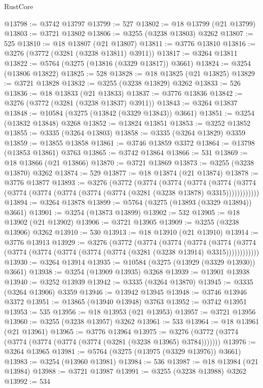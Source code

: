 \begin{lexlean}{RustCore}
\begin{coremodule}
@13798 := @3742 @13797
@13799 := 527
@13802 := @18 @13799 (@21 @13799)
@13803 := @3721 @13802
@13806 := @3255 (@3238 @13803) @3262
@13807 := 525
@13810 := @18 @13807 (@21 @13807)
@13811 := @3776 @13810
@13816 := @3276 (@3772 (@3281 (@3238 @13811) @3911))
@13817 := @3264 @13811
@13822 := @5764 (@3275 (@13816 (@3329 @13817)) @3661)
@13824 := @3254 (@13806 @13822)
@13825 := 528
@13828 := @18 @13825 (@21 @13825)
@13829 := @3721 @13828
@13832 := @3255 (@3238 @13829) @3262
@13833 := 526
@13836 := @18 @13833 (@21 @13833)
@13837 := @3776 @13836
@13842 := @3276 (@3772 (@3281 (@3238 @13837) @3911))
@13843 := @3264 @13837
@13848 := @10584 (@3275 (@13842 (@3329 @13843)) @3661)
@13851 := @3254 (@13832 @13848) @3268
@13852 := @13824 @13851
@13853 := @3252 @13852
@13855 := @3335 (@3264 @13803)
@13858 := @3335 (@3264 @13829) @3359
@13859 := @13855 @13858
@13861 := @3746 @13859 @3372
@13864 := @13798 (@13853 @13861) @3763
@13865 := @3742 @13864
@13866 := 531
@13869 := @18 @13866 (@21 @13866)
@13870 := @3721 @13869
@13873 := @3255 (@3238 @13870) @3262
@13874 := 529
@13877 := @18 @13874 (@21 @13874)
@13878 := @3776 @13877
@13893 := @3276
    (@3772
      (@3774
        (@3774
          (@3774
            (@3774 (@3774 (@3774 (@3774 (@3774 (@3774 (@3774 (@3281 (@3238 @13878) @3315))))))))))))
@13894 := @3264 @13878
@13899 := @5764 (@3275 (@13893 (@3329 @13894)) @3661)
@13901 := @3254 (@13873 @13899)
@13902 := 532
@13905 := @18 @13902 (@21 @13902)
@13906 := @3721 @13905
@13909 := @3255 (@3238 @13906) @3262
@13910 := 530
@13913 := @18 @13910 (@21 @13910)
@13914 := @3776 @13913
@13929 := @3276
    (@3772
      (@3774
        (@3774
          (@3774
            (@3774 (@3774 (@3774 (@3774 (@3774 (@3774 (@3774 (@3281 (@3238 @13914) @3315))))))))))))
@13930 := @3264 @13914
@13935 := @10584 (@3275 (@13929 (@3329 @13930)) @3661)
@13938 := @3254 (@13909 @13935) @3268
@13939 := @13901 @13938
@13940 := @3252 @13939
@13942 := @3335 (@3264 @13870)
@13945 := @3335 (@3264 @13906) @3359
@13946 := @13942 @13945
@13948 := @3746 @13946 @3372
@13951 := @13865 (@13940 @13948) @3763
@13952 := @3742 @13951
@13953 := 535
@13956 := @18 @13953 (@21 @13953)
@13957 := @3721 @13956
@13960 := @3255 (@3238 @13957) @3262
@13961 := 533
@13964 := @18 @13961 (@21 @13961)
@13965 := @3776 @13964
@13975 := @3276 (@3772 (@3774 (@3774 (@3774 (@3774 (@3774 (@3281 (@3238 @13965) @3784)))))))
@13976 := @3264 @13965
@13981 := @5764 (@3275 (@13975 (@3329 @13976)) @3661)
@13983 := @3254 (@13960 @13981)
@13984 := 536
@13987 := @18 @13984 (@21 @13984)
@13988 := @3721 @13987
@13991 := @3255 (@3238 @13988) @3262
@13992 := 534

\end{coremodule}
\end{lexlean}
